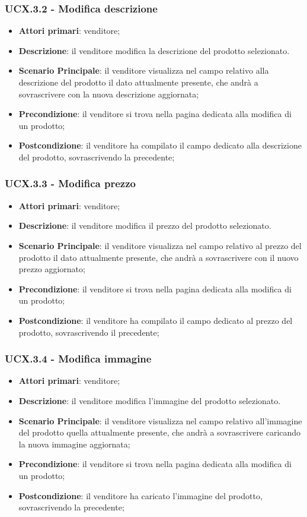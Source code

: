 \subsubsection{UCX.3.2 - Modifica descrizione}
\begin{itemize}
\item \textbf{Attori primari}: venditore;
\item \textbf{Descrizione}: il venditore modifica la descrizione del prodotto selezionato.
\item \textbf{Scenario Principale}: il venditore visualizza nel campo relativo alla descrizione del prodotto il dato attualmente presente, che andrà a sovrascrivere con la nuova descrizione aggiornata;
\item \textbf{Precondizione}: il venditore si trova nella pagina dedicata alla modifica di un prodotto;
\item \textbf{Postcondizione}: il venditore ha compilato il campo dedicato alla descrizione del prodotto, sovrascrivendo la precedente;
\end{itemize}

\subsubsection{UCX.3.3 - Modifica prezzo}
\begin{itemize}
\item \textbf{Attori primari}: venditore;
\item \textbf{Descrizione}: il venditore modifica il prezzo del prodotto selezionato.
\item \textbf{Scenario Principale}: il venditore visualizza nel campo relativo al prezzo del prodotto il dato attualmente presente, che andrà a sovrascrivere con il nuovo prezzo aggiornato;
\item \textbf{Precondizione}: il venditore si trova nella pagina dedicata alla modifica di un prodotto;
\item \textbf{Postcondizione}: il venditore ha compilato il campo dedicato al prezzo del prodotto, sovrascrivendo il precedente;
\end{itemize}

\subsubsection{UCX.3.4 - Modifica immagine}
\begin{itemize}
\item \textbf{Attori primari}: venditore;
\item \textbf{Descrizione}: il venditore modifica l'immagine del prodotto selezionato.
\item \textbf{Scenario Principale}: il venditore visualizza nel campo relativo all'immagine del prodotto quella attualmente presente, che andrà a sovrascrivere caricando la nuova immagine aggiornata;
\item \textbf{Precondizione}: il venditore si trova nella pagina dedicata alla modifica di un prodotto;
\item \textbf{Postcondizione}: il venditore ha caricato l'immagine del prodotto, sovrascrivendo la precedente;
\end{itemize}

